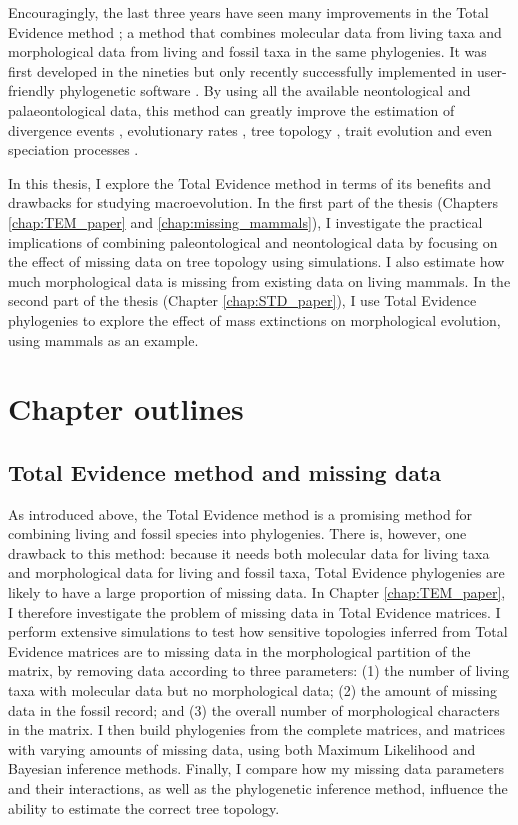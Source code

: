Encouragingly, the last three years have seen many improvements in the Total Evidence method \citep{ronquista2012,Slater2012MEE,Wood01032013,schragocombining2013,beckancient2014,Arcila2015131,Dembo2015}; a method that combines molecular data from living taxa and morphological data from living and fossil taxa in the same phylogenies.
It was first developed in the nineties \citep{eernissetaxonomic1993} but only recently successfully implemented in user-friendly phylogenetic software \citep{Ronquist2012mrbayes,BEAST2}.
By using all the available neontological and palaeontological data, this method can greatly improve the estimation of divergence events \citep{ronquista2012}, evolutionary rates \citep{beckancient2014}, tree topology \citep{Dembo2015}, trait evolution \citep{Slater2012MEE} and even speciation processes \citep{Wood01032013}.

In this thesis, I explore the Total Evidence method in terms of its benefits and drawbacks for studying macroevolution.
In the first part of the thesis (Chapters \ref{chap:TEM_paper} and \ref{chap:missing_mammals}), I investigate the practical implications of combining paleontological and neontological data by focusing on the effect of missing data on tree topology using simulations. I also estimate how much morphological data is missing from existing data on living mammals.
In the second part of the thesis (Chapter \ref{chap:STD_paper}), I use Total Evidence phylogenies to explore the effect of mass extinctions on morphological evolution, using mammals as an example.

\section{Chapter outlines}
\subsection{Total Evidence method and missing data}
As introduced above, the Total Evidence method is a promising method for combining living and fossil species into phylogenies.
There is, however, one drawback to this method: because it needs both molecular data for living taxa and morphological data for living and fossil taxa, Total Evidence phylogenies are likely to have a large proportion of missing data.
In Chapter \ref{chap:TEM_paper}, I therefore investigate the problem of missing data in Total Evidence matrices.
I perform extensive simulations to test how sensitive topologies inferred from Total Evidence matrices are to missing data in the morphological partition of the matrix, by removing data according to three parameters: (1) the number of living taxa with molecular data but no morphological data; (2) the amount of missing data in the fossil record; and (3) the overall number of morphological characters in the matrix.
I then build phylogenies from the complete matrices, and matrices with varying amounts of missing data, using both Maximum Likelihood and Bayesian inference methods.
Finally, I compare how my missing data parameters and their interactions, as well as the phylogenetic inference method, influence the ability to estimate the correct tree topology.


